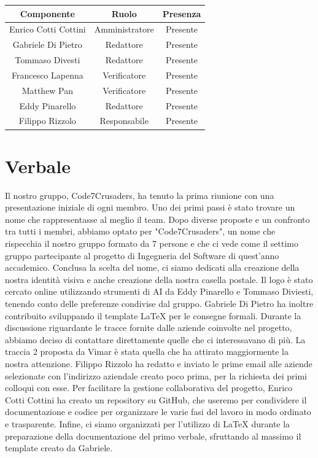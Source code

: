 \documentclass{article}
\begin{document}
\begin{tabular}{|c|c|c|}
    \hline
    \textbf{Componente} & \textbf{Ruolo} & \textbf{Presenza}\\
    \hline
    Enrico Cotti Cottini & Amministratore & Presente \\ 
    \hline
    Gabriele Di Pietro & Redattore & Presente \\ 
    \hline
    Tommaso Divesti & Redattore & Presente \\ 
    \hline 
    Francesco Lapenna & Verificatore & Presente \\ 
    \hline
    Matthew Pan & Verificatore & Presente \\ 
    \hline 
    Eddy Pinarello & Redattore & Presente \\ 
    \hline
    Filippo Rizzolo & Responsabile & Presente \\ 
    \hline
\end{tabular}



\newpage
\section{Verbale}

\label{sec:verbale}
{\Large
Il nostro gruppo, Code7Crusaders, ha tenuto la prima riunione con una presentazione iniziale di ogni membro. Uno dei primi passi è stato trovare un nome che rappresentasse al meglio il team. Dopo diverse proposte e un confronto tra tutti i membri, abbiamo optato per "Code7Crusaders", un nome che rispecchia il nostro gruppo formato da 7 persone e che ci vede come il settimo gruppo partecipante al progetto di Ingegneria del Software di quest’anno accademico.\newline
Conclusa la scelta del nome, ci siamo dedicati alla creazione della nostra identità visiva e anche creazione della nostra casella postale. Il logo è stato cercato online utilizzando strumenti di AI da Eddy Pinarello e Tommaso Diviesti, tenendo conto delle preferenze condivise dal gruppo. Gabriele Di Pietro ha inoltre contribuito sviluppando il template LaTeX per le consegne formali.\newline
Durante la discussione riguardante le tracce fornite dalle aziende coinvolte nel progetto, abbiamo deciso di contattare direttamente quelle che ci interessavano di più. La traccia 2 proposta da Vimar è stata quella che ha attirato maggiormente la nostra attenzione. Filippo Rizzolo ha redatto e inviato le prime email alle aziende selezionate con l'indirizzo aziendale creato poco prima, per la richiesta dei primi colloqui con esse.\newline
Per facilitare la gestione collaborativa del progetto, Enrico Cotti Cottini ha creato un repository su GitHub, che useremo per condividere il documentazione e codice per organizzare le varie fasi del lavoro in modo ordinato e trasparente. \newline
Infine, ci siamo organizzati per l'utilizzo di LaTeX durante la preparazione della documentazione del primo verbale, sfruttando al massimo il template creato da Gabriele.}
\end{document}
